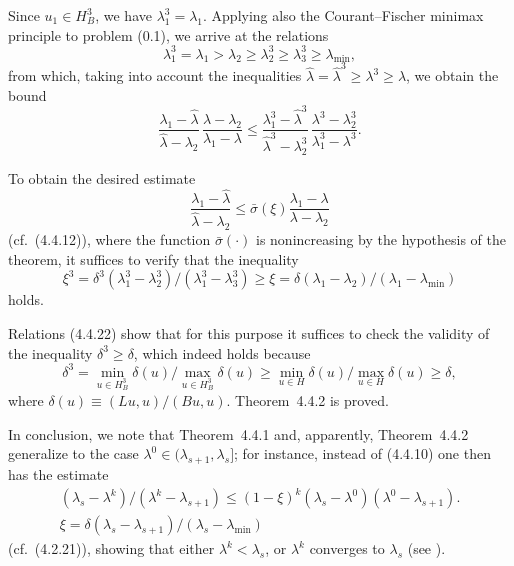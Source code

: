 \documentclass[11pt,oneside]{book}
\begin{document}
Since $u_1 \in H_B^3$, we have $\lambda_1^3 = \lambda_1$. Applying also the Courant--Fischer minimax principle to problem (0.1), we arrive at the relations
\[
\lambda_1^3 = \lambda_1 > \lambda_2 \geqslant \lambda_2^3 \geqslant \lambda_3^3 \geqslant \lambda_{\min}, \tag{4.4.22}
\]
from which, taking into account the inequalities $\hat{\lambda} = \hat{\lambda}^3 \geqslant \lambda^3 \geqslant \lambda$, we obtain the bound
\[
\frac{\lambda_1 - \hat{\lambda}}{\hat{\lambda} - \lambda_2} \, \frac{\lambda - \lambda_2}{\lambda_1 - \lambda} \leqslant \frac{\lambda_1^3 - \hat{\lambda}^3}{\hat{\lambda}^3 - \lambda_2^3} \, \frac{\lambda^3 - \lambda_2^3}{\lambda_1^3 - \lambda^3}.
\]

To obtain the desired estimate
\[
\frac{\lambda_1 - \hat{\lambda}}{\hat{\lambda} - \lambda_2} \leqslant \bar{\sigma}(\xi) \frac{\lambda_1 - \lambda}{\lambda - \lambda_2} \tag{4.4.23}
\]
(cf.\ (4.4.12)), where the function $\bar{\sigma}(\cdot)$ is nonincreasing by the hypothesis of the theorem, it suffices to verify that the inequality
\[
\xi^3 = \delta^3(\lambda_1^3 - \lambda_2^3)/(\lambda_1^3 - \lambda_3^3) \geqslant \xi = \delta(\lambda_1 - \lambda_2)/(\lambda_1 - \lambda_{\min})
\]
holds.

Relations (4.4.22) show that for this purpose it suffices to check the validity of the inequality $\delta^3 \geqslant \delta$, which indeed holds because
\[
\delta^3 = \min_{u \in H_B^3} \delta(u) \Big/ \max_{u \in H_B^3} \delta(u) \geqslant \min_{u \in H} \delta(u) \Big/ \max_{u \in H} \delta(u) \geqslant \delta,
\]
where $\delta(u) \equiv (Lu, u)/(Bu, u)$. Theorem~4.4.2 is proved.

In conclusion, we note that Theorem~4.4.1 and, apparently, Theorem~4.4.2 generalize to the case $\lambda^0 \in (\lambda_{s+1}, \lambda_s]$; for instance, instead of (4.4.10) one then has the estimate
\begin{gather*}
(\lambda_s - \lambda^k)/(\lambda^k - \lambda_{s+1}) \leqslant (1 - \xi)^k (\lambda_s - \lambda^0)(\lambda^0 - \lambda_{s+1}). \tag{4.4.24} \\ %
\xi = \delta(\lambda_s - \lambda_{s+1})/(\lambda_s - \lambda_{\min})
\end{gather*}
(cf.\ (4.2.21)), showing that either $\lambda^k < \lambda_s$, %
or $\lambda^k$ converges to $\lambda_s$ (see \citep{DyakonovOrekhov1980}).
\end{document}
